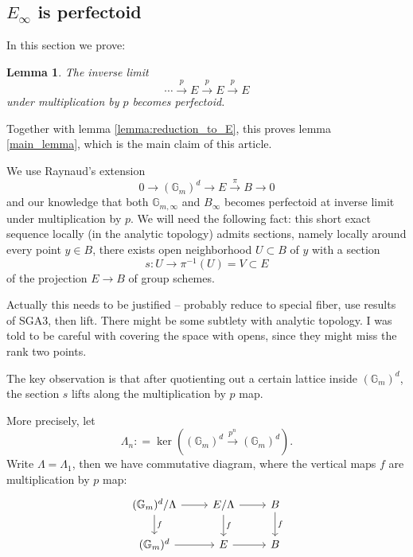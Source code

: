 \documentclass[11pt,oneside]{amsart}
\theoremstyle{theorem}
\newtheorem{lemma}[theorem]{Lemma}
\theoremstyle{definition}
\theoremstyle{remark}
\begin{document}
\subsection{$E_\infty$ is perfectoid}

In this section we prove: 

\begin{lemma} \label{lemma:E_is_perfectoid}
The inverse limit
$$ \cdots  \xrightarrow{p} E   \xrightarrow{p} E   \xrightarrow{p} E  $$
under multiplication by $p$ becomes perfectoid.  
\end{lemma}

Together with lemma \ref{lemma:reduction_to_E}, this proves lemma \ref{main_lemma}, which is the main claim of this article. 

We use Raynaud's extension 
$$ 0 \rightarrow (\mathbb G_m)^d \rightarrow E \xrightarrow{\pi} B \rightarrow 0 $$ and our knowledge that both $\mathbb G_{m, \infty}$ and $B_\infty$ becomes perfectoid at inverse limit under multiplication by $p$. We will need the following fact: this short exact sequence locally (in the analytic topology) admits sections, namely locally around every point $y \in B$, there exists open neighborhood  $U \subset B$ of $y$ with a section
$$s: U \rightarrow \pi^{-1} (U) = V \subset E$$ of the projection $E \rightarrow B$ of group schemes. 

{\color{red} Actually this needs to be justified -- probably reduce to special fiber, use results of SGA3, then lift. There might be some subtlety with analytic topology. I was told to be careful with covering the space with opens, since they might miss the rank two points. }

The key observation is that after quotienting out a certain lattice inside $(\mathbb G_m)^d$, the section $s$ lifts along the multiplication by $p$ map. 

More precisely, let 
$$\Lambda_n : = \ker ((\mathbb G_m)^d \xrightarrow{p^n} (\mathbb G_m)^d).$$ 
Write $\Lambda = \Lambda_1$,
then we have commutative diagram, where the vertical maps $f$ are multiplication by $p$ map: 
\[
\begin{tikzcd}
(\mathbb G_m)^d/\Lambda \arrow{r}{} \arrow{d}{f} & E/\Lambda \arrow{r}{}  \arrow{d}{f } & B  \arrow{d}{f} \\ 
(\mathbb G_m)^d  \arrow{r}{} & E \arrow{r}{} & B 
\end{tikzcd}
\]
\end{document}
